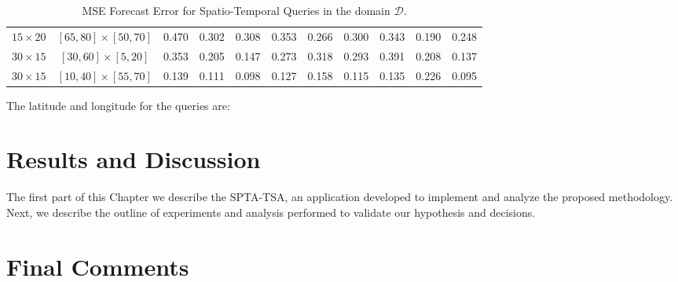 \begin{table}[h]
\begin{tabular}{|c|c|r|r|r|r|r|r|r|r|r|}
		$15 \times 20$ & $[65, 80] \times [50, 70]$ & 0.470 & 0.302 & 0.308 & 0.353 & 0.266 & 0.300 & 0.343 & 0.190 & 0.248\\ %
		$30 \times 15$ & $[30, 60] \times [ 5, 20]$ & 0.353 & 0.205 & 0.147 & 0.273 & 0.318 & 0.293 & 0.391 & 0.208 & 0.137 \\ %
		$30 \times 15$ & $[10, 40] \times [55, 70]$ & 0.139 & 0.111 & 0.098 & 0.127 & 0.158 & 0.115 & 0.135 & 0.226 & 0.095 \\ %
		\hline
	\end{tabular}
	\caption{MSE Forecast Error for Spatio-Temporal Queries in the domain $\mathcal{D}$.}
	\label{Table:MSEForecasError}
\end{table}

The latitude and longitude for the queries are:

%
%
%
%
%
%
%
%
%

\section{Results and Discussion} 

The first part of this Chapter we describe the SPTA-TSA, an application developed to implement and analyze the proposed methodology. Next, we describe the outline of experiments and analysis performed to validate our hypothesis and decisions. 



\section{Final Comments}
